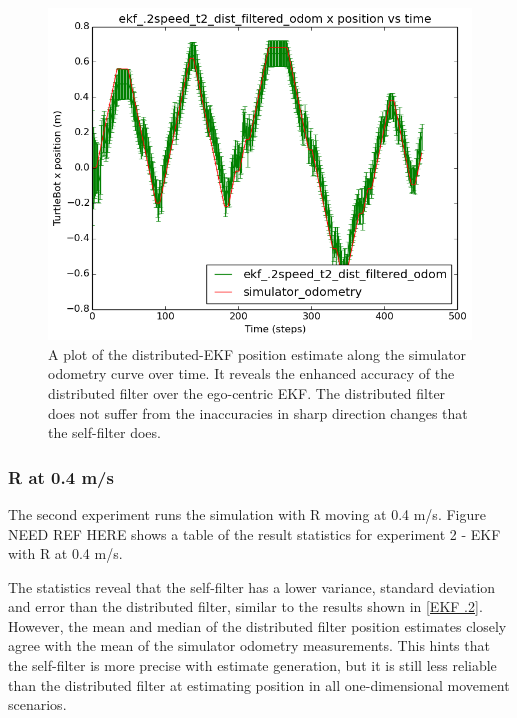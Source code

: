 \documentclass[conference]{IEEEtran} \usepackage[T1]{fontenc} \usepackage[backend=biber, style=ieee]{biblatex}
\begin{document}
\begin{figure}
\centering 
\includegraphics[scale=.45]{ekf_2speed_t2_dist_filtered_odom_pos_err_graph}
\caption {A plot of the distributed-EKF position estimate along the simulator odometry curve over time. It 
reveals the enhanced accuracy of the distributed filter over the ego-centric EKF. The distributed filter does not suffer 
from the inaccuracies in sharp direction changes that the self-filter does.}
\label{pic4}
\end{figure}

\subsubsection{R at 0.4 m/s} \label{EKF .4}
The second experiment runs the simulation with R moving at 0.4 m/s. Figure NEED REF HERE shows a table of the result statistics for 
experiment 2 - EKF with R at 0.4 m/s. 


The statistics reveal that the self-filter has a lower variance, standard deviation and error than the distributed 
filter, similar to the results shown in \ref{EKF .2}. However, the mean and median of the distributed filter position estimates closely agree with the mean of the 
simulator odometry measurements. This hints that the self-filter is more precise with estimate generation, but it is 
still less reliable than the distributed filter at estimating position in all one-dimensional movement scenarios.
\end{document}
